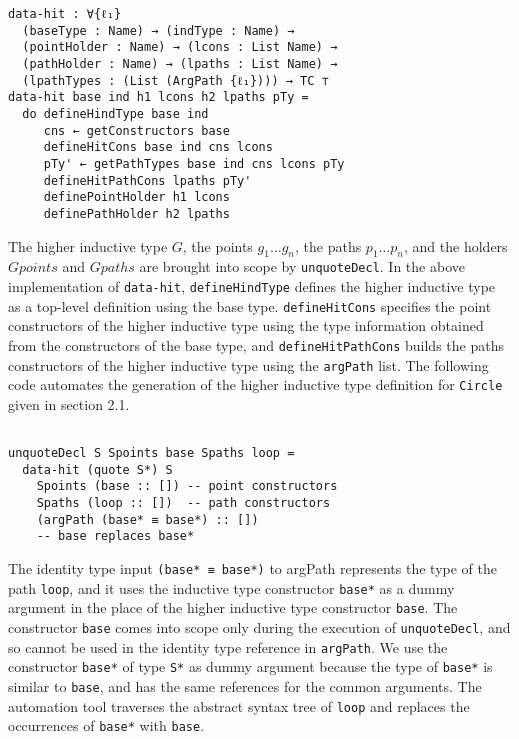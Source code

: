 \documentclass[sigplan,10pt]{acmart}
\begin{document}
\begin{center}
\begingroup
\begin{BVerbatim}
data-hit : ∀{ℓ₁} 
  (baseType : Name) → (indType : Name) →
  (pointHolder : Name) → (lcons : List Name) →
  (pathHolder : Name) → (lpaths : List Name) →
  (lpathTypes : (List (ArgPath {ℓ₁}))) → TC ⊤
data-hit base ind h1 lcons h2 lpaths pTy =
  do defineHindType base ind
     cns ← getConstructors base
     defineHitCons base ind cns lcons
     pTy' ← getPathTypes base ind cns lcons pTy
     defineHitPathCons lpaths pTy'
     definePointHolder h1 lcons
     definePathHolder h2 lpaths
\end{BVerbatim}
\endgroup
\end{center}

The higher inductive type $G$, the points $g_1 \ldots g_n$, the paths $p_1 \ldots p_n$, and the holders $Gpoints$ and $Gpaths$ are brought into scope by {\tt unquoteDecl}. In the above implementation of {\tt data-hit}, {\tt defineHindType} defines the higher inductive type as a top-level definition using the base type. {\tt defineHitCons} specifies the point constructors of the higher inductive type using the type information obtained from the constructors of the base type, and {\tt defineHitPathCons} builds the paths constructors of the higher inductive type using the {\tt argPath} list. The following code automates the generation of the higher inductive type definition for {\tt Circle} given in section 2.1.
\begin{center}
\begingroup
\begin{BVerbatim}

unquoteDecl S Spoints base Spaths loop =
  data-hit (quote S*) S
    Spoints (base :: []) -- point constructors
    Spaths (loop :: [])  -- path constructors
    (argPath (base* ≡ base*) :: []) 
    -- base replaces base*

\end{BVerbatim}
\endgroup
\end{center}

The identity type input {\tt (base* ≡ base*)} to argPath represents the type of the path {\tt loop}, and it uses the inductive type constructor {\tt base*} as a dummy argument in the place of the higher inductive type constructor {\tt base}. The constructor {\tt base} comes into scope only during the execution of {\tt unquoteDecl}, and so cannot be used in the identity type reference in {\tt argPath}. We use the constructor {\tt base*} of type {\tt S*} as dummy argument because the type of {\tt base*} is similar to {\tt base}, and has the same references for the common arguments. The automation tool traverses the abstract syntax tree of {\tt loop} and replaces the occurrences of {\tt base*} with {\tt base}.
\end{document}
